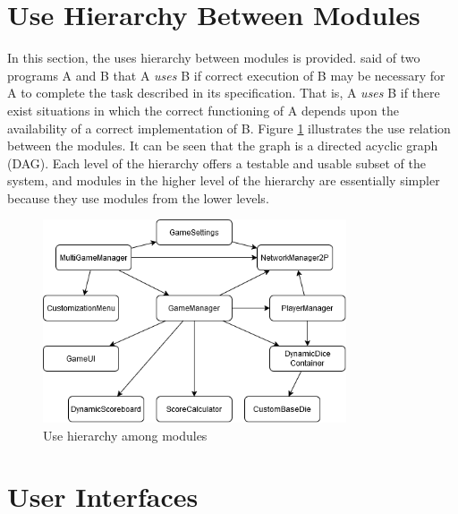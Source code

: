 \documentclass[12pt, titlepage]{article}
\begin{document}
\newpage
\section{Use Hierarchy Between Modules} \label{SecUse}

In this section, the uses hierarchy between modules is
provided. \citet{Parnas1978} said of two programs A and B that A {\em uses} B if
correct execution of B may be necessary for A to complete the task described in
its specification. That is, A {\em uses} B if there exist situations in which
the correct functioning of A depends upon the availability of a correct
implementation of B.  Figure \ref{FigUH} illustrates the use relation between
the modules. It can be seen that the graph is a directed acyclic graph
(DAG). Each level of the hierarchy offers a testable and usable subset of the
system, and modules in the higher level of the hierarchy are essentially simpler
because they use modules from the lower levels.



\begin{figure}[H]
\centering
\includegraphics[width=0.8\textwidth]{figures/UsesHierarchy}
\caption{Use hierarchy among modules}
\label{FigUH}
\end{figure}


\newpage
\section{User Interfaces}

\end{document}
